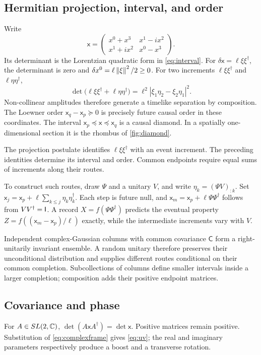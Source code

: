 \subsection{Hermitian projection, interval, and order}
Write
\begin{equation*}
\mathsf x=\begin{pmatrix}x^0+x^3&x^1-ix^2\\x^1+ix^2&x^0-x^3\end{pmatrix}.
\end{equation*}
Its determinant is the Lorentzian quadratic form in \cref{eq:interval}. For \(\delta\mathsf x=\ell\xi\xi^\dagger\), the determinant is zero and \(\delta x^0=\ell\left\lVert\xi\right\rVert^2/2\ge0\). For two increments \(\ell\xi\xi^\dagger\) and \(\ell\eta\eta^\dagger\),
\begin{equation*}
\det\big(\ell\xi\xi^\dagger+\ell\eta\eta^\dagger\big)
=\ell^2|\xi_1\eta_2-\xi_2\eta_1|^2.
\end{equation*}
Non-collinear amplitudes therefore generate a timelike separation by composition. The Loewner order \(\mathsf x_q-\mathsf x_p\succeq0\) is precisely future causal order in these coordinates. The interval \(\mathsf x_p\preceq\mathsf x\preceq\mathsf x_q\) is a causal diamond. In a spatially one-dimensional section it is the rhombus of \cref{fig:diamond}.

The projection postulate identifies \(\ell\xi\xi^\dagger\) with an event increment. The preceding identities determine its interval and order. Common endpoints require equal sums of increments along their routes.

To construct such routes, draw \(\Psi\) and a unitary \(V\), and write \(\eta_k=(\Psi V)_{:k}\). Set \(\mathsf x_j=\mathsf x_p+\ell\sum_{k\le j}\eta_k\eta_k^\dagger\). Each step is future null, and \(\mathsf x_m=\mathsf x_p+\ell\Psi\Psi^\dagger\) follows from \(VV^\dagger=\mathsf I\). A record \(X=f(\Psi\Psi^\dagger)\) predicts the eventual property \(Z=f((\mathsf x_m-\mathsf x_p)/\ell)\) exactly, while the intermediate increments vary with \(V\).

Independent complex-Gaussian columns with common covariance \(\mathsf C\) form a right-unitarily invariant ensemble. A random unitary therefore preserves their unconditional distribution and supplies different routes conditional on their common completion. Subcollections of columns define smaller intervals inside a larger completion; composition adds their positive endpoint matrices.

\subsection{Covariance and phase}
For \(A\in SL(2,\mathbb C)\), \(\det(A\mathsf xA^\dagger)=\det\mathsf x\). Positive matrices remain positive. Substitution of \cref{eq:complexframe} gives \cref{eq:uv}; the real and imaginary parameters respectively produce a boost and a transverse rotation.

